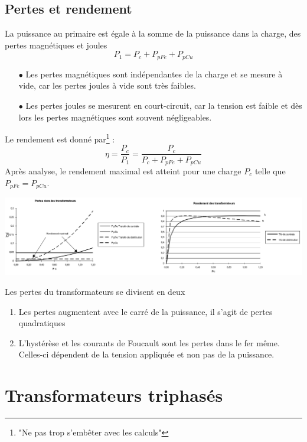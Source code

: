 	\subsection{Pertes et rendement}
	La puissance au primaire est égale à la somme de la puissance dans la charge, 
	des pertes magnétiques et joules
	\begin{equation}
	P_1 = P_c + P_{pFe}  + P_{pCu}
	\end{equation}
	\begin{itemize}
	\item[$\bullet$] Les pertes magnétiques sont indépendantes de la charge et 
	se mesure à vide, car les pertes joules à vide sont très faibles.
	\item[$\bullet$] Les pertes joules se mesurent en court-circuit, car la tension 
	est faible et dès lors les pertes magnétiques sont souvent négligeables.
	\end{itemize}
	Le rendement est donné par\footnote{"Ne pas trop s'embêter avec les calculs"} :
	\begin{equation}
	\eta = \dfrac{P_c}{P_1} = \dfrac{P_c}{P_c+P_{pFe} + P_{pCu}}
	\end{equation}
	Après analyse, le rendement maximal est atteint pour une charge $P_c$ telle 
	que $P_{pFe} = P_{pCu}$.
	
	\begin{center}
	\includegraphics[scale=0.35]{ch3/imager4.png}
	\end{center}
	Les pertes du transformateurs se divisent en deux
	\begin{enumerate}
	\item Les pertes augmentent avec le carré de la puissance, il s'agit de pertes
	quadratiques
	\item L'hystérèse et les courants de Foucault sont les pertes dans le fer même. 
	Celles-ci dépendent de la tension appliquée et non pas de la puissance.
	\end{enumerate}
\newpage	
\section{Transformateurs triphasés}
